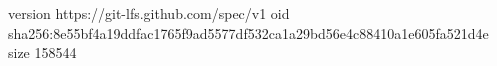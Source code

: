 version https://git-lfs.github.com/spec/v1
oid sha256:8e55bf4a19ddfac1765f9ad5577df532ca1a29bd56e4c88410a1e605fa521d4e
size 158544
